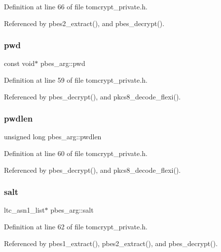 Definition at line 66 of file tomcrypt\+\_\+private.\+h.



Referenced by pbes2\+\_\+extract(), and pbes\+\_\+decrypt().

\mbox{\label{structpbes__arg_a146b6c8875be0a3ac9f426327e83186a}} 
\subsubsection{\texorpdfstring{pwd}{pwd}}
{\footnotesize\ttfamily const void$\ast$ pbes\+\_\+arg\+::pwd}



Definition at line 59 of file tomcrypt\+\_\+private.\+h.



Referenced by pbes\+\_\+decrypt(), and pkcs8\+\_\+decode\+\_\+flexi().

\mbox{\label{structpbes__arg_a6f7f1324f1acfd51dcc7c1e334db7e0a}} 
\subsubsection{\texorpdfstring{pwdlen}{pwdlen}}
{\footnotesize\ttfamily unsigned long pbes\+\_\+arg\+::pwdlen}



Definition at line 60 of file tomcrypt\+\_\+private.\+h.



Referenced by pbes\+\_\+decrypt(), and pkcs8\+\_\+decode\+\_\+flexi().

\mbox{\label{structpbes__arg_a356304efb7c4b45d06779905fd254797}} 
\subsubsection{\texorpdfstring{salt}{salt}}
{\footnotesize\ttfamily ltc\+\_\+asn1\+\_\+list$\ast$ pbes\+\_\+arg\+::salt}



Definition at line 62 of file tomcrypt\+\_\+private.\+h.



Referenced by pbes1\+\_\+extract(), pbes2\+\_\+extract(), and pbes\+\_\+decrypt().

